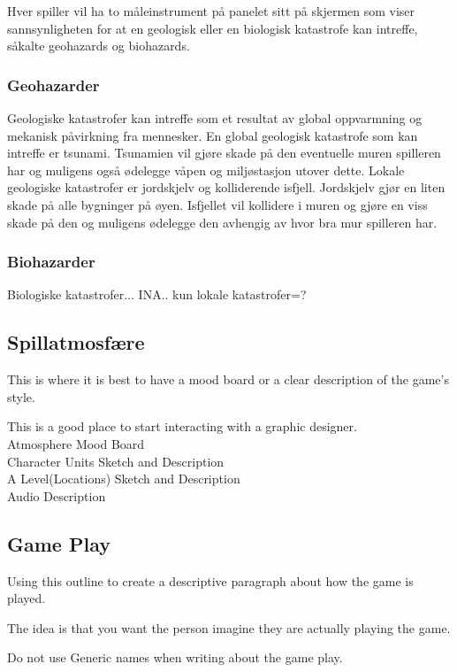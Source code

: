 Hver spiller vil ha to måleinstrument på panelet sitt på skjermen som viser sannsynligheten for at en geologisk eller en biologisk katastrofe kan intreffe, såkalte geohazards og biohazards.

\subsubsection{Geohazarder}
Geologiske katastrofer kan intreffe som et resultat av global oppvarmning og mekanisk påvirkning fra mennesker.
En global geologisk katastrofe som kan intreffe er tsunami. Tsunamien vil gjøre skade på den eventuelle muren spilleren har og muligens også ødelegge våpen og miljøstasjon utover dette.
Lokale geologiske katastrofer er jordskjelv og kolliderende isfjell. Jordskjelv gjør en liten skade på alle bygninger på øyen. Isfjellet vil kollidere i muren og gjøre en viss skade på den og muligens ødelegge den avhengig av hvor bra mur spilleren har. 


\subsubsection{Biohazarder}
Biologiske katastrofer... INA.. kun lokale katastrofer=?


\subsection{Spillatmosfære}

This is where it is best to have a mood board or a clear description of the game’s style. 

This is a good place to start interacting with a graphic designer.\\

Atmosphere Mood Board\\
Character  Units Sketch and Description\\
A Level(Locations) Sketch and Description\\
Audio Description

\subsection{Game Play}

Using this outline to create a descriptive paragraph about how the game is played. 

The idea is that you want the person imagine they are actually playing the game.

Do not use Generic names when writing about the game play. 

